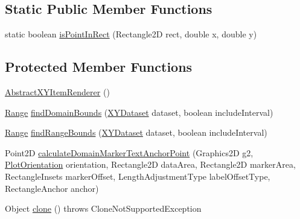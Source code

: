 \subsection*{Static Public Member Functions}
\begin{DoxyCompactItemize}
\item 
static boolean \mbox{\hyperlink{classorg_1_1jfree_1_1chart_1_1renderer_1_1xy_1_1_abstract_x_y_item_renderer_aaa32657930a98e8447a42798696130d8}{is\+Point\+In\+Rect}} (Rectangle2D rect, double x, double y)
\end{DoxyCompactItemize}
\subsection*{Protected Member Functions}
\begin{DoxyCompactItemize}
\item 
\mbox{\hyperlink{classorg_1_1jfree_1_1chart_1_1renderer_1_1xy_1_1_abstract_x_y_item_renderer_a93f070bf82aaf5858c742f0c39021c4d}{Abstract\+X\+Y\+Item\+Renderer}} ()
\item 
\mbox{\hyperlink{classorg_1_1jfree_1_1data_1_1_range}{Range}} \mbox{\hyperlink{classorg_1_1jfree_1_1chart_1_1renderer_1_1xy_1_1_abstract_x_y_item_renderer_a544e92256a7b92c4ca49e46df84de6a3}{find\+Domain\+Bounds}} (\mbox{\hyperlink{interfaceorg_1_1jfree_1_1data_1_1xy_1_1_x_y_dataset}{X\+Y\+Dataset}} dataset, boolean include\+Interval)
\item 
\mbox{\hyperlink{classorg_1_1jfree_1_1data_1_1_range}{Range}} \mbox{\hyperlink{classorg_1_1jfree_1_1chart_1_1renderer_1_1xy_1_1_abstract_x_y_item_renderer_afbec9a3d7cef1554317e2cebf6c9802d}{find\+Range\+Bounds}} (\mbox{\hyperlink{interfaceorg_1_1jfree_1_1data_1_1xy_1_1_x_y_dataset}{X\+Y\+Dataset}} dataset, boolean include\+Interval)
\item 
Point2D \mbox{\hyperlink{classorg_1_1jfree_1_1chart_1_1renderer_1_1xy_1_1_abstract_x_y_item_renderer_accfab3e67da90db2cf0b7b42d4058e12}{calculate\+Domain\+Marker\+Text\+Anchor\+Point}} (Graphics2D g2, \mbox{\hyperlink{classorg_1_1jfree_1_1chart_1_1plot_1_1_plot_orientation}{Plot\+Orientation}} orientation, Rectangle2D data\+Area, Rectangle2D marker\+Area, Rectangle\+Insets marker\+Offset, Length\+Adjustment\+Type label\+Offset\+Type, Rectangle\+Anchor anchor)
\item 
Object \mbox{\hyperlink{classorg_1_1jfree_1_1chart_1_1renderer_1_1xy_1_1_abstract_x_y_item_renderer_aca2ace2c1f3a2667e7f1636c6ae8b14f}{clone}} ()  throws Clone\+Not\+Supported\+Exception 
\item 

\end{DoxyCompactItemize}
